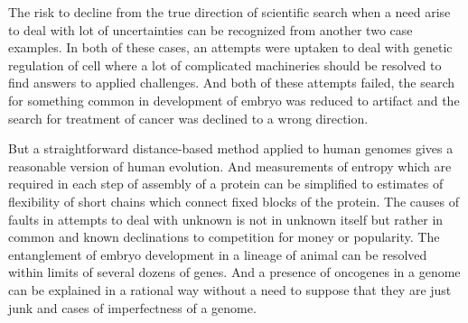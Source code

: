 \documentclass[12pt,aps]{revtex4}
\begin{document}
The risk to decline from the true direction of scientific search when a need arise to deal with lot of uncertainties can be recognized from another two case examples. In both of these cases, an attempts were uptaken to deal with genetic regulation of cell where a lot of complicated machineries should be resolved to find answers to applied challenges. And both of these attempts failed, the search for something common in development of embryo was reduced to artifact and the search for treatment of cancer was declined to a wrong direction.

But a straightforward distance-based method applied to human genomes gives a reasonable version of human evolution. And  measurements of entropy which are required in each step of assembly of a protein can be simplified to estimates of flexibility of short chains which connect fixed blocks of the protein. The causes of faults in attempts to deal with unknown is not in unknown itself but rather in common and known declinations to competition for money or popularity. The entanglement of embryo development in a lineage of animal can be resolved within limits of several dozens of genes. And a presence of oncogenes in a genome can be explained in a rational way without a need to suppose that they are just junk and cases of imperfectness of a genome. 
\end{document}
